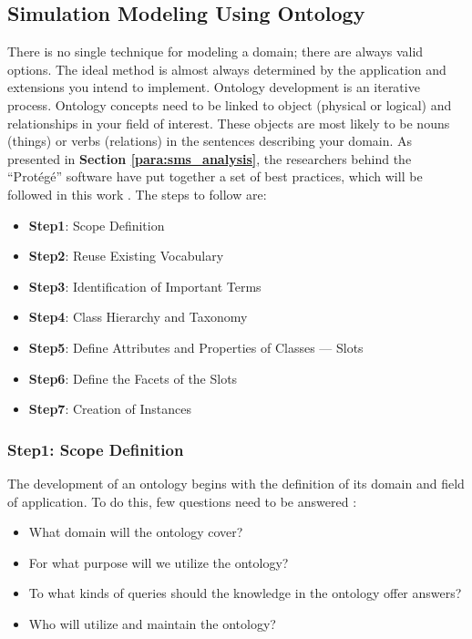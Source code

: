 \subsection{Simulation Modeling Using Ontology}
There is no single technique for modeling a domain; there are always valid options. The ideal method is almost always determined by the application and extensions you intend to implement. Ontology development is an iterative process. Ontology concepts need to be linked to object (physical or logical) and relationships in your field of interest. These objects are most likely to be nouns (things) or verbs (relations) in the sentences describing your domain. As presented in \textbf{Section \ref{para:sms_analysis}}, the researchers behind the “Protégé” software have put together a set of best practices, which will be followed in this work \cite{noy2001ontology}. The steps to follow are:

\begin{itemize}
    \item \textbf{Step1}: Scope Definition
    \item \textbf{Step2}: Reuse Existing Vocabulary
    \item \textbf{Step3}: Identification of Important Terms
    \item \textbf{Step4}: Class Hierarchy and Taxonomy
    \item \textbf{Step5}: Define Attributes and Properties of Classes — Slots
    \item \textbf{Step6}: Define the Facets of the Slots
    \item \textbf{Step7}: Creation of Instances
\end{itemize}

    \subsubsection{Step1: Scope Definition}
    The development of an ontology begins with the definition of its domain and field of application. To do this, few questions need to be answered \cite{noy2001ontology}:
    
    \begin{itemize}
        \item What domain will the ontology cover? 
        \item For what purpose will we utilize the ontology? 
        \item To what kinds of queries should the knowledge in the ontology offer answers? 
        \item Who will utilize and maintain the ontology?
    \end{itemize}
    
